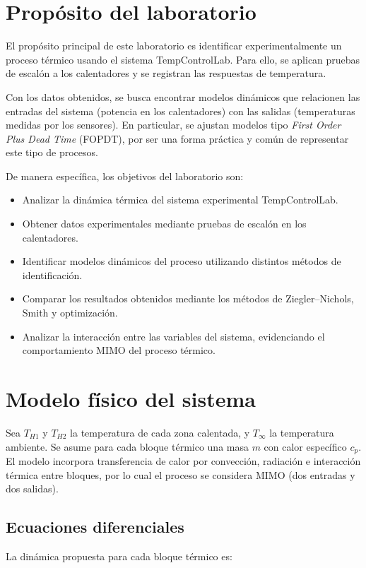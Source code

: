 \documentclass[letterpaper,12pt]{article}
\begin{document}
\section{Propósito del laboratorio}

El propósito principal de este laboratorio es identificar experimentalmente un proceso térmico usando el sistema TempControlLab. Para ello, se aplican pruebas de escalón a los calentadores y se registran las respuestas de temperatura.

Con los datos obtenidos, se busca encontrar modelos dinámicos que relacionen las entradas del sistema (potencia en los calentadores) con las salidas (temperaturas medidas por los sensores). En particular, se ajustan modelos tipo \textit{First Order Plus Dead Time} (FOPDT), por ser una forma práctica y común de representar este tipo de procesos.

De manera específica, los objetivos del laboratorio son:

\begin{itemize}
    \item Analizar la dinámica térmica del sistema experimental TempControlLab.
    \item Obtener datos experimentales mediante pruebas de escalón en los calentadores.
    \item Identificar modelos dinámicos del proceso utilizando distintos métodos de identificación.
    \item Comparar los resultados obtenidos mediante los métodos de Ziegler–Nichols, Smith y optimización.
    \item Analizar la interacción entre las variables del sistema, evidenciando el comportamiento MIMO del proceso térmico.
\end{itemize}


\section{Modelo físico del sistema}

Sea $T_{H1}$ y $T_{H2}$ la temperatura de cada zona calentada, y $T_{\infty}$ la temperatura ambiente. Se asume para cada bloque térmico una masa $m$ con calor específico $c_p$. El modelo incorpora transferencia de calor por convección, radiación e interacción térmica entre bloques, por lo cual el proceso se considera MIMO (dos entradas y dos salidas).

\subsection*{Ecuaciones diferenciales}
La dinámica propuesta para cada bloque térmico es:
\end{document}
